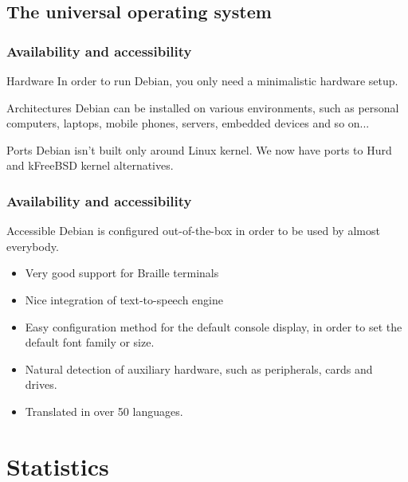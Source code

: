 \documentclass[xcolor=dvipsnames]{beamer}
\begin{document}
\subsection{The universal operating system}
\begin{frame}
\frametitle{Availability and accessibility}
\begin{block}
{Hardware}
In order to run Debian, you only need a minimalistic hardware setup.
\end{block}
\begin{block}
{Architectures}
Debian can be installed on various environments, such as personal computers, laptops, mobile phones, servers, embedded devices and so on...
\end{block}
\begin{block}
{Ports}
Debian isn't built only around Linux kernel. We now have ports to Hurd and kFreeBSD kernel alternatives.
\end{block}
\end{frame}
%
\begin{frame}
\frametitle{Availability and accessibility}
\begin{block}
{Accessible}
Debian is configured out-of-the-box in order to be used by almost everybody.\\
\begin{itemize}
\item Very good support for Braille terminals
\item Nice integration of text-to-speech engine
\item Easy configuration method for the default console display, in order to set the default font family or size.
\item Natural detection of auxiliary hardware, such as peripherals, cards and drives.
\item Translated in over 50 languages.
\end{itemize}
\end{block}
\end{frame}

\section{Statistics}
\end{document}
